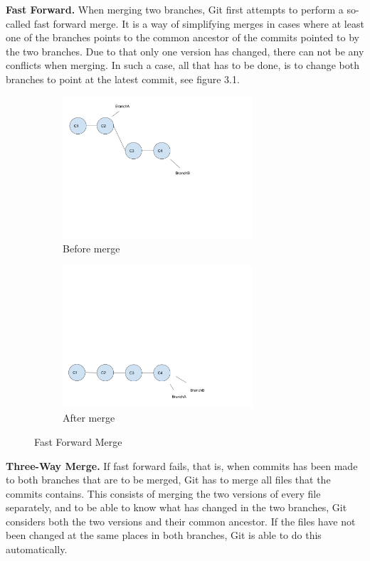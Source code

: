 \textbf{Fast Forward.} When merging two branches, Git first attempts to perform a so-called fast forward merge. It is a way of simplifying merges in cases where at least one of the branches points to the common ancestor of the commits pointed to by the two branches. Due to that only one version has changed, there can not be any conflicts when merging. In such a case, all that has to be done, is to change both branches to point at the latest commit, see figure 3.1.
\begin{figure}[h]
    \centering
    \begin{subfigure}[b]{0.3\textwidth}
        \includegraphics[width=200pt]{figure/ff1.png}
        \caption{Before merge}
        \label{fig:branch1}
    \end{subfigure}
    \begin{subfigure}[b]{0.3\textwidth}
        \includegraphics[width=200pt]{figure/ff2.png}
        \caption{After merge}
        \label{fig:branch3}
    \end{subfigure}
    \caption{Fast Forward Merge}\label{fig:fastforward}
\end{figure}

\textbf{Three-Way Merge.} If fast forward fails, that is, when commits has been made to both branches that are to be merged, Git has to merge all files that the commits contains. This consists of merging the two versions of every file separately, and to be able to know what has changed in the two branches, Git considers both the two versions and their common ancestor. If the files have not been changed at the same places in both branches, Git is able to do this automatically.

